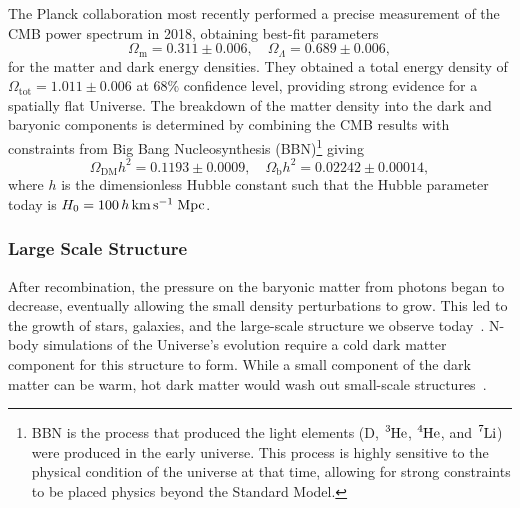 The Planck collaboration most recently performed a precise measurement of the CMB power spectrum in 2018, obtaining best-fit parameters~\cite{Planck:2018vyg_sep_Planck2018results,Planck:2019nip_sep_Planck2018results}
\begin{equation}
     \Omega_\mathrm{m} = 0.311 \pm 0.006,\quad \Omega_\Lambda = 0.689 \pm 0.006,
\end{equation}
for the matter and dark energy densities. They obtained a total energy density of $\Omega_\mathrm{tot} = 1.011 \pm 0.006$ at $68\%$ confidence level, providing strong evidence for a spatially flat Universe. 
The breakdown of the matter density into the dark and baryonic components is determined by combining the CMB results with constraints from Big Bang Nucleosynthesis (BBN)\footnote{BBN is the process that produced the light elements (D, $\ce{^3 He}$, $\ce{^4 He}$, and $\ce{^7 Li}$) were produced in the early universe. This process is highly sensitive to the physical condition of the universe at that time, allowing for strong constraints to be placed physics beyond the Standard Model.} giving
\begin{equation}
    \Omega_\mathrm{DM}h^2 = 0.1193 \pm 0.0009,\quad \Omega_\mathrm{b}h^2 = 0.02242 \pm 0.00014,
\end{equation}
where $h$ is the dimensionless Hubble constant such that the Hubble parameter today is $H_0 = 100\, h{\rm \,km}{\rm \,s}^{-1}\;\mathrm{Mpc}$. 



\subsubsection*{Large Scale Structure}
After recombination, the pressure on the baryonic matter from photons began to decrease, eventually allowing the small density perturbations to grow. This led to the growth of stars, galaxies, and the large-scale structure we observe today~\cite{Springel:2006vs_LargescalestructureUniverse}. N-body simulations of the Universe's evolution require a cold dark matter component for this structure to form. While a small component of the dark matter can be warm, hot dark matter would wash out small-scale structures~\cite{Springel:2005nw_Simulatingjointevolution}.  

